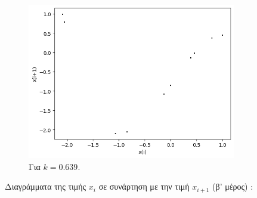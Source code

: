 \begin{figure}[h!]
\begin{subfigure}[b]{0.4\textwidth}
		\includegraphics[width=\textwidth]{LateX images/graphs q21/g13}
		\caption{Για $k=0.639$.}
		\label{f:k113}
	\end{subfigure}
	\hfill
	\caption{Διαγράμματα της τιμής \(x_i\) σε συνάρτηση με την τιμή \(x_{i+1}\) (β' μέρος) :}
	\label{f:k245}
\end{figure}

\clearpage

